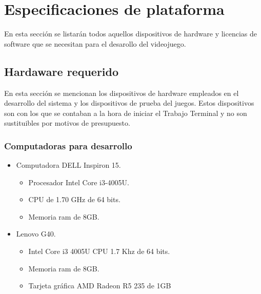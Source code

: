 	\section{Especificaciones de plataforma}\label{Sec_Plataforma}
	En esta sección se listarán todos aquellos dispositivos de hardware y licencias
	 de software que se necesitan para el desarollo del videojuego.
	 
	 \subsection{Hardaware requerido}\label{Sec_PlataformaHw}
	 En esta sección se mencionan los dispositivos de hardware empleados en el 
	 desarrollo del sistema y los dispositivos de prueba del juegos. Estos 
	 dispositivos son con los que se contaban a la hora de iniciar el Trabajo Terminal
	 y no son sustituibles por motivos de presupuesto.
	 	\subsubsection{Computadoras para desarrollo}
	 		\begin{itemize}
	 			\item Computadora DELL Inspiron 15.
	 				\begin{itemize}
	 					\item Procesador Intel Core i3-4005U. 
	 					\item CPU de 1.70 GHz de 64 bits. 
	 					\item Memoria ram de 8GB.
	 				\end{itemize}
				\item Lenovo G40. 
					\begin{itemize}
						\item Intel Core i3 4005U CPU 1.7 Khz de 64 bits. 
						\item Memoria ram de 8GB. 
						\item Tarjeta gráfica AMD Radeon R5 235 de 1GB
					\end{itemize}
	 		\end{itemize}
	 		
